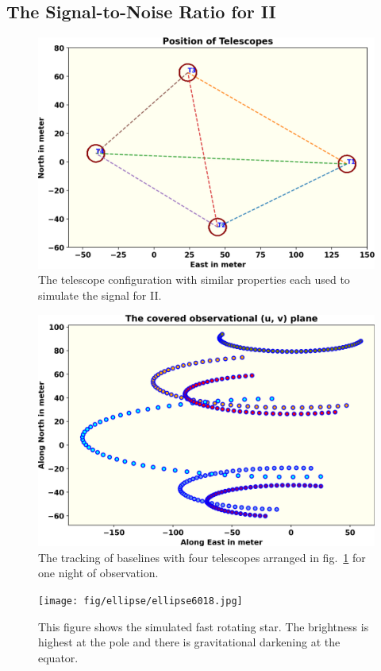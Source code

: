 \subsection{The Signal-to-Noise Ratio for II}
\begin{figure}
	\centering
	\includegraphics[width=\linewidth]{fig/telescope.png}
	\caption{The telescope configuration with similar properties each used to simulate the signal for II.}
	\label{fig:teles}
\end{figure}
\begin{figure}
	\centering
	\includegraphics[width=\linewidth]{fig/baseline.png}
	\caption{The tracking of baselines with four telescopes arranged in fig.~\ref{fig:teles} for one night of observation.}
	\label{fig:base}
\end{figure}
\begin{figure}
	\centering
	\texttt{[image: fig/ellipse/ellipse6018.jpg]}
	\caption{This figure shows the simulated fast rotating star. The brightness is highest at the pole and there is gravitational darkening at the equator.}
	\label{fig:image}
\end{figure}
